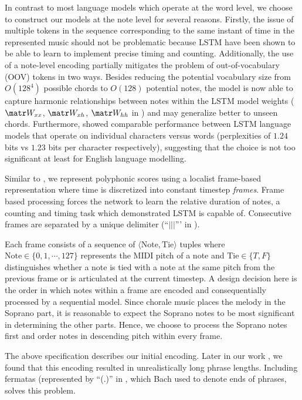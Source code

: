 In contrast to most language models which operate at the word level, we choose
to construct our models at the note level for several reasons.
Firstly, the issue of multiple tokens in the sequence corresponding to the same
instant of time in the represented music should not be problematic because
LSTM have been shown to be able to learn to implement precise timing and
counting\cite{gers2002learning}. Additionally, the use of a note-level encoding
partially mitigates the problem of out-of-vocabulary (OOV) tokens in two ways.
Besides reducing the potential vocabulary size from $O(128^4)$ possible chords
to $O(128)$ potential notes, the model is now able to capture harmonic
relationships between notes within the LSTM model weights ($\W_{xx}$,
$\W_{xh}$, $\W_{hh}$ in ) and may generalize better to unseen
chords. Furthermore, \citet{graves2013generating} showed comparable performance
between LSTM language models that operate on individual characters versus words
(perplexities of $1.24$ bits vs $1.23$ bits per character respectively),
suggesting that the choice is not too significant at least for English language
modelling.

Similar to \citep{todd1989connectionist}, we represent polyphonic scores using
a localist frame-based representation where time is discretized into constant
timestep \emph{frames}. Frame based processing forces the network to learn the
relative duration of notes, a counting and timing task which
\citep{gers2002learning} demonstrated LSTM is capable of. Consecutive frames are
separated by a unique delimiter (``$|||$''' in ).

Each frame consists of a sequence of $\langle \text{Note}, \text{Tie} \rangle$
tuples where $\text{Note} \in \{0,1,\cdots,127\}$ represents the MIDI pitch of
a note and $\text{Tie} \in \{T,F\}$ distinguishes whether a note is tied with a
note at the same pitch from the previous frame or is articulated at the current
timestep. A design decision here is the order in which notes within a frame are
encoded and consequentially processed by a sequential model. Since chorale
music places the melody in the Soprano part, it is reasonable to expect the
Soprano notes to be most significant in determining the other parts. Hence, we
choose to process the Soprano notes first and order notes in descending pitch
within every frame.

The above specification describes our initial encoding. Later in our work
, we found that this encoding resulted in unrealistically long
phrase lengths. Including fermatas (represented by ``(.)'' in , which Bach used to denote ends of phrases, solves this problem.

